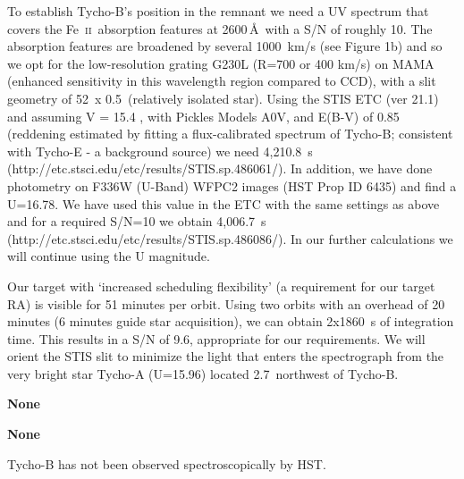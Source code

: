 \documentclass[12pt]{article}
\newcommand{\feii}{Fe~\textsc{ii}}
\begin{document}
To establish Tycho-B's position in the remnant we need a UV spectrum that covers the \feii\ absorption features at 2600\,\AA\ with a S/N of roughly 10. The absorption features are broadened by several 1000~km/s (see Figure 1b) and so we opt for the low-resolution grating G230L (R=700 or 400 km/s) on MAMA (enhanced sensitivity in this wavelength region compared to CCD), with a slit geometry of 52\arcsec\ x 0.5\arcsec\ (relatively isolated star). Using the STIS ETC (ver 21.1) and assuming V = 15.4 \citep{2004Natur.431.1069R}, with Pickles Models A0V, and E(B-V) of 0.85 (reddening estimated by fitting a flux-calibrated spectrum of Tycho-B; consistent with Tycho-E - a background source) we need  4,210.8~s (http://etc.stsci.edu/etc/results/STIS.sp.486061/). 
In addition, we have done photometry on F336W (U-Band) WFPC2 images (HST Prop ID 6435) and find a U=16.78. We have used this value in the ETC with the same settings as above and for a required S/N=10 we obtain 4,006.7~s (http://etc.stsci.edu/etc/results/STIS.sp.486086/). In our further calculations we will continue using the U magnitude.


Our target with `increased scheduling flexibility' (a requirement for our target RA) is visible for 51 minutes per orbit. Using two orbits with an overhead of 20 minutes (6 minutes guide star acquisition), we can obtain 2x1860~s of integration time. This results in a S/N of  9.6, appropriate for our requirements. We will orient the STIS slit to minimize the light that enters the spectrograph from the very bright star Tycho-A (U=15.96) located 2.7\arcsec\ northwest of Tycho-B.



%
%
\specialreq

\textbf{None}             %


%
%
\coordinatedobs          %
\textbf{None}

%
%
\duplications           %
Tycho-B has not been observed spectroscopically by HST.
\end{document}
